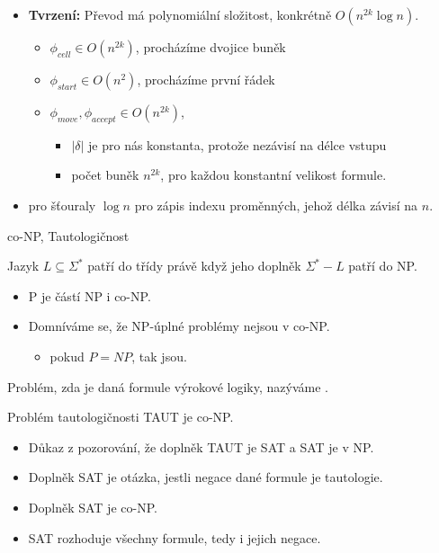     \begin{frame}{}
    \begin{proofe}
    \begin{itemize}
    \item {\bf Tvrzení:} Převod má polynomiální složitost, konkrétně $O(n^{2k}\log n)$.
    \begin{itemize}
        \item $\phi_{cell}\in O(n^{2k})$, procházíme dvojice buněk
        \item $\phi_{start}\in O(n^{2})$, procházíme první řádek
        \item $\phi_{move},\phi_{accept}\in O(n^{2k})$, 
    \begin{itemize}
        \item 	$|\delta|$ je pro nás konstanta, protože nezávisí na délce vstupu
    \item počet buněk $n^{2k}$, pro každou konstantní velikost formule.
    \end{itemize}
        
    \end{itemize}
    \item pro šťouraly $\log n$ pro zápis indexu proměnných, jehož délka závisí na $n$.
    \end{itemize}
    \end{proofe}
    \end{frame}
    
    \begin{frame}{co-NP, Tautologičnost}
    \begin{definition}
    Jazyk $L\subseteq \Sigma^*$ patří do třídy  právě když jeho doplněk $\Sigma^*-L$ patří do NP.
    \end{definition}
    \begin{itemize}
        \item P je částí NP i co-NP.
        \item Domníváme se, že NP-úplné problémy nejsou v co-NP.
        
        \begin{itemize}
            \item pokud $P=NP$, tak jsou.
        \end{itemize}
    \end{itemize}
    \begin{definition}[tautologičnost]
    Problém, zda je daná formule výrokové logiky, nazýváme .
    \end{definition}
    \begin{theorem}
    Problém tautologičnosti TAUT je co-NP.
    \end{theorem}
    \begin{itemize}
        \item Důkaz z pozorování, že doplněk TAUT je SAT a SAT je v NP.
        \item Doplněk SAT je otázka, jestli negace dané formule je tautologie.
    \item Doplněk SAT je co-NP.
    \item SAT rozhoduje všechny formule, tedy i jejich negace.
    \end{itemize}
    \end{frame}
    
